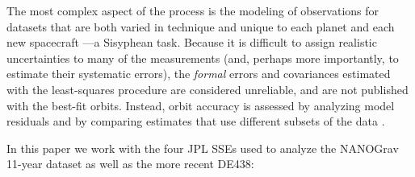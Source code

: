 \documentclass[reprint,
 amsmath,amssymb,
 aps,prd,floatfix,
]{revtex4-1}
\begin{document}
The most complex aspect of the process is the modeling of observations for datasets that are both varied in technique and unique to each planet and each new spacecraft \cite{moyer2003}---a Sisyphean task. Because it is difficult to assign realistic uncertainties to many of the measurements (and, perhaps more importantly, to estimate their systematic errors), the \emph{formal} errors and covariances estimated with the least-squares procedure are considered unreliable, and are not published with the best-fit orbits. Instead, orbit accuracy is assessed by analyzing model residuals and by comparing estimates that use different subsets of the data \cite{de434cov,de438}.

In this paper we work with the four JPL SSEs used to analyze the NANOGrav 11-year dataset \cite{2018ApJ...859...47A} as well as the more recent DE438:
%
\end{document}
